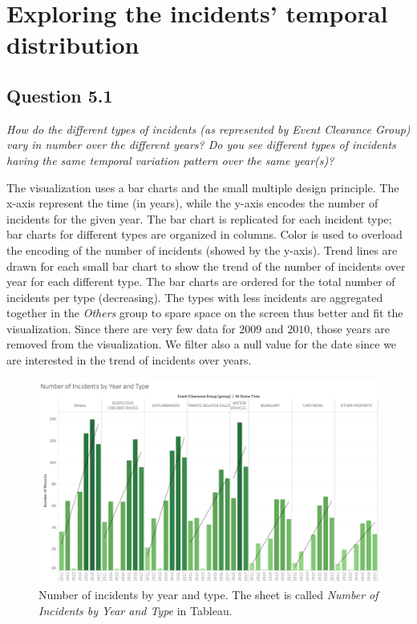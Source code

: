 \section{Exploring the incidents' temporal distribution}

\subsection*{Question 5.1}
\textit{How do the different types of incidents (as represented by Event Clearance Group) vary in number over the different years? Do you see different types of incidents having the same temporal variation pattern over the same year(s)?}

The visualization uses a bar charts and the small multiple design principle.
The x-axis represent the time (in years), while the y-axis encodes the number of incidents for the given year.
The bar chart is replicated for each incident type; bar charts for different types are organized in columns.
Color is used to overload the encoding of the number of incidents (showed by the y-axis).
Trend lines are drawn for each small bar chart to show the trend of the number of incidents over year for each different type.
The bar charts are ordered for the total number of incidents per type (decreasing).
The types with less incidents are aggregated together in the \textit{Others} group to spare space on the screen thus better and fit the visualization.
Since there are very few data for $2009$ and $2010$, those years are removed from the visualization.
We filter also a null value for the date since we are interested in the trend of incidents over years.

\begin{figure}[h]
	\centering
	\includegraphics[width=0.9\columnwidth]{figures/5_1_incidents_by_type_and_year}
	\caption{Number of incidents by year and type. The sheet is called \textit{Number of Incidents by Year and Type} in Tableau.}
	\label{fig:5_1_incidents_by_type_and_year}
\end{figure}

